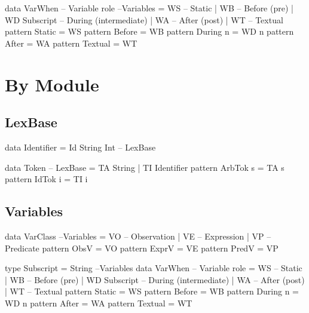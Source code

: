 \begin{code}
data VarWhen -- Variable role                                      --Variables
  = WS            --  Static
  | WB            --  Before (pre)
  | WD Subscript  --  During (intermediate)
  | WA            --  After (post)
  | WT            --  Textual
pattern Static    =  WS
pattern Before    =  WB
pattern During n  =  WD n
pattern After     =  WA
pattern Textual   =  WT
\end{code}

\section{By Module}

\subsection{LexBase}

\begin{code}
data Identifier = Id String Int                                    -- LexBase
\end{code}

\begin{code}
data Token                                                         -- LexBase
 = TA String
 | TI Identifier
pattern ArbTok s = TA s
pattern IdTok i = TI i
\end{code}

\subsection{Variables}

\begin{code}
data VarClass                                                     --Variables
  = VO -- Observation
  | VE -- Expression
  | VP -- Predicate
pattern ObsV  = VO
pattern ExprV = VE
pattern PredV = VP
\end{code}

\begin{code}
type Subscript = String                                           --Variables
data VarWhen -- Variable role
  = WS            --  Static
  | WB            --  Before (pre)
  | WD Subscript  --  During (intermediate)
  | WA            --  After (post)
  | WT            --  Textual
pattern Static    =  WS
pattern Before    =  WB
pattern During n  =  WD n
pattern After     =  WA
pattern Textual   =  WT
\end{code}

